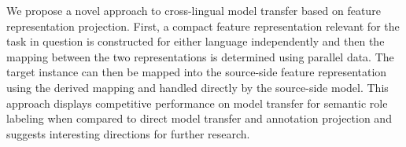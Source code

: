We propose a novel approach to cross-lingual model transfer based on feature representation projection. First, a compact feature representation relevant for the task in question is constructed for either language independently and then the mapping between the two representations is determined using parallel data. The target instance can then be mapped into the source-side feature representation using the derived mapping and handled directly by the source-side model. This approach displays competitive performance on model transfer for semantic role labeling when compared to direct model transfer and annotation projection and suggests interesting directions for further research.
